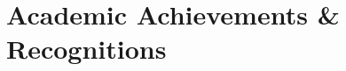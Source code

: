 \documentclass[10pt,a4paper,sans]{moderncv} %
\begin{document}




\section{Academic Achievements \& Recognitions }
\end{document}
